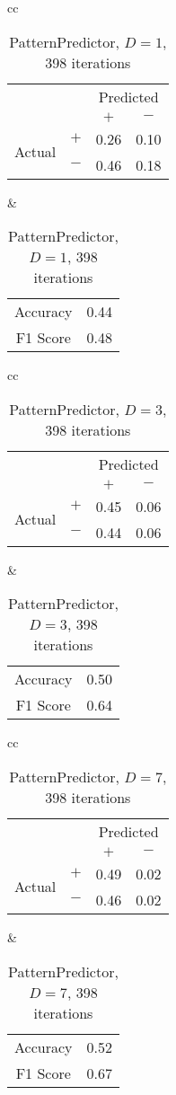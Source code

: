 \documentclass[twocolumn,10pt]{asme2ej}
\begin{document}
\begin{table}
  \begin{tabular}{cc}
    \begin{tabular}{cc|cc}
      & & \multicolumn{2}{c}{Predicted} \\
      & & $+ $ & $-$ \\
      \hline
      \multirow{2}{*}{Actual}
      & $+$ & 0.26 & 0.10 \\
      & $-$ & 0.46 & 0.18 \\
      \hline
    \end{tabular}
    &
    \begin{tabular}{cc}
      Accuracy & 0.44 \\
      F1 Score & 0.48 \\
    \end{tabular}
  \end{tabular}
  \caption{PatternPredictor, $D=1$, 398 iterations}
  \label{pred-perf-PatternPredictor-1-398}
\end{table}


\begin{table}
  \begin{tabular}{cc}
    \begin{tabular}{cc|cc}
      & & \multicolumn{2}{c}{Predicted} \\
      & & $+ $ & $-$ \\
      \hline
      \multirow{2}{*}{Actual}
      & $+$ & 0.45 & 0.06 \\
      & $-$ & 0.44 & 0.06 \\
      \hline
    \end{tabular}
    &
    \begin{tabular}{cc}
      Accuracy & 0.50 \\
      F1 Score & 0.64 \\
    \end{tabular}
  \end{tabular}
  \caption{PatternPredictor, $D=3$, 398 iterations}
  \label{pred-perf-PatternPredictor-3-398}
\end{table}


\begin{table}
  \begin{tabular}{cc}
    \begin{tabular}{cc|cc}
      & & \multicolumn{2}{c}{Predicted} \\
      & & $+ $ & $-$ \\
      \hline
      \multirow{2}{*}{Actual}
      & $+$ & 0.49 & 0.02 \\
      & $-$ & 0.46 & 0.02 \\
      \hline
    \end{tabular}
    &
    \begin{tabular}{cc}
      Accuracy & 0.52 \\
      F1 Score & 0.67 \\
    \end{tabular}
  \end{tabular}
  \caption{PatternPredictor, $D=7$, 398 iterations}
  \label{pred-perf-PatternPredictor-7-398}
\end{table}
\end{document}
